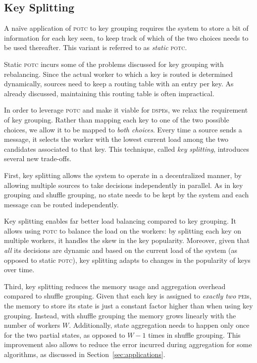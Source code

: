 \documentclass[10pt,conference,letterpaper]{IEEEtran}
\newcommand{\pei}{\textsc{pei}\xspace}
\newcommand{\peis}{{\pei}s\xspace}
\newcommand{\potc}{\textsc{p\textup{o}tc}\xspace}
\newcommand{\dspe}{\textsc{dspe}\xspace}
\newcommand{\dspes}{{\dspe}s\xspace}
\begin{document}
\subsection{Key Splitting}

A na\"{i}ve application of \potc to key grouping requires the system to store a bit of information for each key seen, to keep track of which of the two choices needs to be used thereafter.
This variant is referred to as \emph{static} \potc.

Static \potc incurs some of the problems discussed for key grouping with rebalancing.
Since the actual worker to which a key is routed is determined dynamically, sources need to keep a routing table with an entry per key.
As already discussed, maintaining this routing table is often impractical.

In order to leverage \potc and make it viable for \dspes, we relax the requirement of key grouping.
Rather than mapping each key to one of the two possible choices, we allow it to be mapped to \emph{both choices}.
Every time a source sends a message, it selects the worker with the lowest current load among the two candidates associated to that key.
This technique, called \emph{key splitting}, introduces several new trade-offs.

First, key splitting allows the system to operate in a decentralized manner, by allowing multiple sources to take decisions independently in parallel.
As in key grouping and shuffle grouping, no state needs to be kept by the system and each message can be routed independently.

Key splitting enables far better load balancing compared to key grouping.
It allows using \potc to balance the load on the workers:
by splitting each key on multiple workers, it handles the skew in the key popularity.
Moreover, given that \emph{all} its decisions are dynamic and based on the current load of the system (as opposed to static \potc), key splitting adapts to changes in the popularity of keys over time.

Third, key splitting reduces the memory usage and aggregation overhead compared to shuffle grouping.
Given that each key is assigned to \emph{exactly two} \peis, the memory to store its state is just a constant factor higher than when using key grouping.
Instead, with shuffle grouping the memory grows linearly with the number of workers $W$.
Additionally, state aggregation needs to happen only once for the two partial states, as opposed to $W - 1$ times in shuffle grouping.
This improvement also allows to reduce the error incurred during aggregation for some algorithms, as discussed in Section~\ref{sec:applications}.
\end{document}
